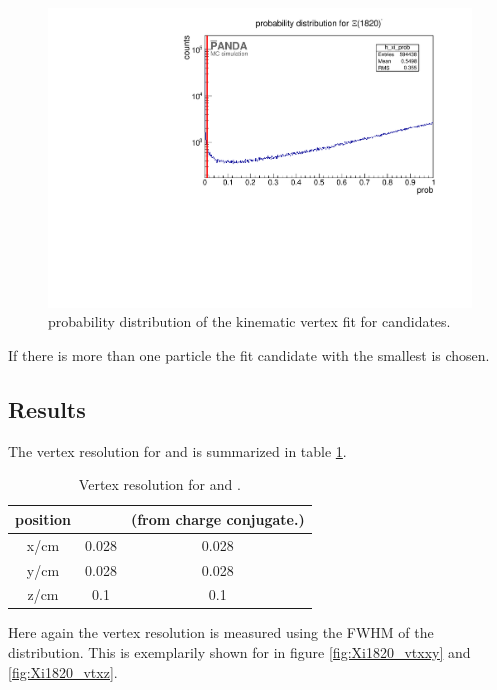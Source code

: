 		\begin{figure}
			\centering
			\includegraphics[width=1.\textwidth]{./plots/Xi1820/XiMinus1820_prob.pdf}
			\caption{\propose probability distribution of the kinematic vertex fit for \excitedcascade candidates.}
			\label{fig:xi1820_prob}
		\end{figure}
		
		If there is more than one particle the fit candidate with the smallest \chisq is chosen.
		
	\subsection*{Results}
	The vertex resolution for \excitedcascade and \excitedanticascade is summarized in table \ref{tab:Xi1820_vtxres}.
	
	\begin{table}
		\centering
		\caption{\propose Vertex resolution for \excitedcascade and \excitedanticascade.}
		\label{tab:Xi1820_vtxres}
		\begin{tabular}{ccc}
			\hline
			position & \excitedcascade & \excitedanticascade (from charge conjugate.) \\
			\hline
			\hline
			x/cm & 0.028 & 0.028\\
			y/cm & 0.028 & 0.028\\
			z/cm & 0.1 & 0.1\\
			\hline
			 
		\end{tabular}
	\end{table}
	
	Here again the vertex resolution is measured using the FWHM of the distribution. 
	This is exemplarily shown for \excitedcascade in figure \ref{fig:Xi1820_vtxxy} and \ref{fig:Xi1820_vtxz}.
	
